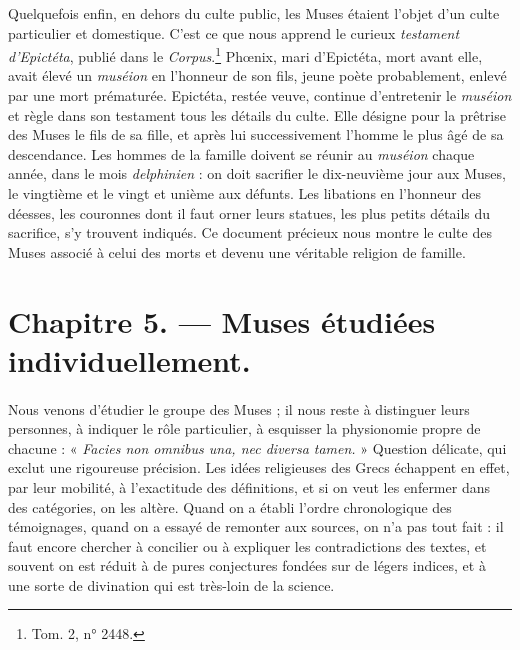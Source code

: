 \documentclass[a4paper, 11pt, oneside, polutonikogreek, french]{article}
\begin{document}
Quelquefois enfin, en dehors du culte public, les Muses étaient l'objet d'un culte particulier et domestique. C'est ce que nous apprend le curieux \emph{testament d'Epictéta}, publié dans le \emph{Corpus}.\footnote{Tom. 2, n° 2448.} Phœnix, mari d'Epictéta, mort avant elle, avait élevé un \emph{muséion} en l'honneur de son fils, jeune poète probablement, enlevé par une mort prématurée. Epictéta, restée veuve, continue d'entretenir le \emph{muséion} et règle dans son testament tous les détails du culte. Elle désigne pour la prêtrise des Muses le fils de sa fille, et après lui successivement l'homme le plus âgé de sa descendance. Les hommes de la famille doivent se réunir au \emph{muséion} chaque année, dans le mois \emph{delphinien} : on doit sacrifier le dix-neuvième jour aux Muses, le vingtième et le vingt et unième aux défunts. Les libations en l'honneur des déesses, les couronnes dont il faut orner leurs statues, les plus petits détails du sacrifice, s'y trouvent indiqués. Ce document précieux nous montre le culte des Muses associé à celui des morts et devenu une véritable religion de famille.
\clearpage
\section{Chapitre 5. --- Muses étudiées individuellement.}
\paragraph{}
Nous venons d'étudier le groupe des Muses ; il nous reste à distinguer leurs personnes, à indiquer le rôle particulier, à esquisser la physionomie propre de chacune : « \emph{Facies non omnibus una, nec diversa tamen.} » Question délicate, qui exclut une rigoureuse précision. Les idées religieuses des Grecs échappent en effet, par leur mobilité, à l'exactitude des définitions, et si on veut les enfermer dans des catégories, on les altère. Quand on a établi l'ordre chronologique des témoignages, quand on a essayé de remonter aux sources, on n'a pas tout fait : il faut encore chercher à concilier ou à expliquer les contradictions des textes, et souvent on est réduit à de pures conjectures fondées sur de légers indices, et à une sorte de divination qui est très-loin de la science.
\end{document}
